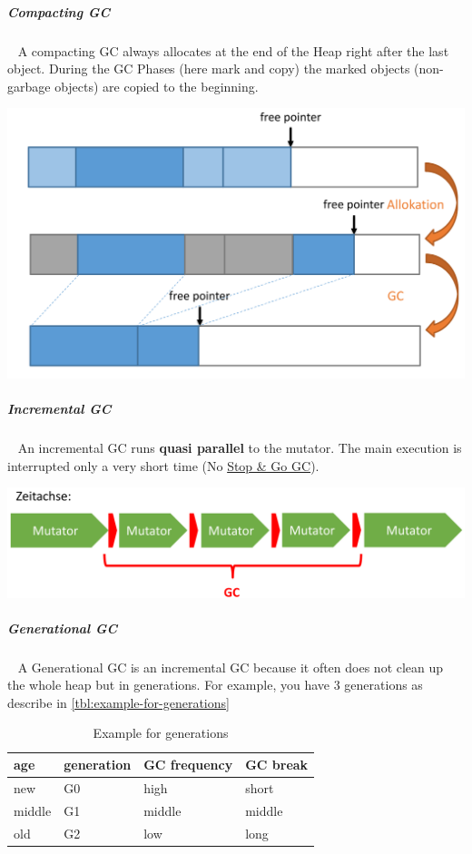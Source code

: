 \documentclass[11pt,twoside,landscape]{article}
\begin{document}
\begin{multicols}{3}
\subparagraph{Compacting GC} \
\label{sec:org51f4ac1}
A compacting GC always allocates at the end of the Heap right after the last object.
During the GC Phases (here mark and copy) the marked objects (non-garbage objects) are copied to the beginning.


{
\begin{center}
\includegraphics[width=.9\linewidth]{img/compacting_gc.png}
\end{center}
\label{fig:compacting-gc-example}
}
\subparagraph{Incremental GC} \
\label{sec:org0df491d}
An incremental GC runs \textbf{quasi parallel} to the mutator.
The main execution is interrupted only a very short time (No \href{../../../roam/20221230204307-when_is_the_garbage_collector_executed.org}{Stop \& Go GC}).


{
\begin{center}
\includegraphics[width=.9\linewidth]{img/incremental_gc.png}
\end{center}
\captionof{figure}{Incremental GC}\label{fig:incremental-gc}
}

\subparagraph{Generational GC} \
\label{sec:orgb04de04}
A Generational GC is an incremental GC because it often does not clean up the whole heap but in generations.
For example, you have 3 generations as describe in \autoref{tbl:example-for-generations}

\begin{table}[htbp]
\caption{\label{tbl:example-for-generations}Example for generations}
\centering
\begin{tabular}{llll}
age & generation & GC frequency & GC break\\[0pt]
\hline
new & G0 & high & short\\[0pt]
middle & G1 & middle & middle\\[0pt]
old & G2 & low & long\\[0pt]
\end{tabular}
\end{table}


\end{multicols}
\end{document}
